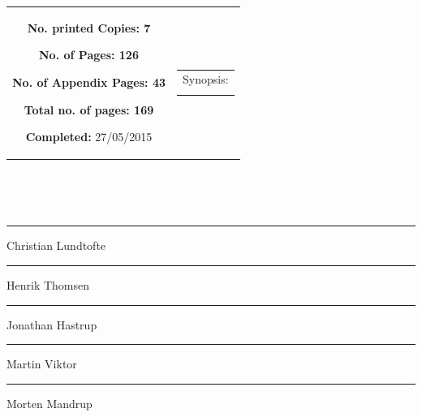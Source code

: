 {\begin{tabular}{cc}
{	\begin{description}
		\item { \textbf{No. printed Copies: 7} }
		\item { \textbf{No. of Pages: 126} } 
		\item { \textbf{No. of Appendix Pages: 43} }
		\item { \textbf{Total no. of pages: 169} } 
		\item { \textbf{Completed:} 27/05/2015}
	\end{description}
	\vfill } &
	\parbox{7cm}{
 	 \vspace{.15cm}
  	\hfill 
  	\begin{tabular}{l}
  		{ Synopsis:}\bigskip \\
  		\fbox{
  		\parbox{6.5cm}{\bigskip
     		{\vfill{\small 
     		\bigskip}}
     	}}
   	\end{tabular}}
\end{tabular}
}%
\\
\vfill
{}

\null\vfill
\begin{center}\hspace*{\fill} \\[5cm]
\begin{minipage}{0.4\textwidth}
\begin{flushleft} \large
{\rule{\linewidth}{0.5mm}}
Christian Lundtofte\\[2cm]
{\rule{\linewidth}{0.5mm}}
Henrik Thomsen\\[2cm]
{\rule{\linewidth}{0.5mm}}
Jonathan Hastrup\\[2cm]
\end{flushleft}
\end{minipage}
\begin{minipage}{0.4\textwidth}
\begin{flushright} \large
{\rule{\linewidth}{0.5mm}}
Martin Viktor\\[2cm]
{\rule{\linewidth}{0.5mm}}
Morten Mandrup\\[2cm]
\end{flushright}
\end{minipage}

\end{center}
\vfill\clearpage

%